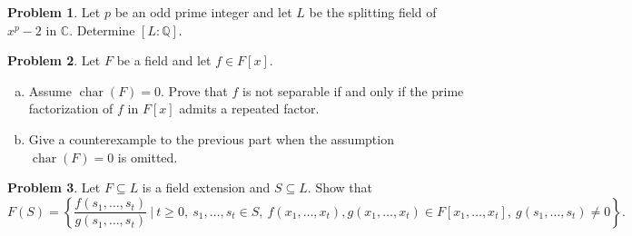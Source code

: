 \documentclass[11pt]{article}
\DeclareMathOperator{\ch}{char}
\newcommand{\C}{\mathbb{C}}
\newcommand{\Q}{\mathbb{Q}}
\theoremstyle{definition}
\newtheorem{problem}{Problem}
\begin{document}
\begin{problem}
Let $p$ be an odd prime integer and let $L$ be the splitting field of $x^p-2$ in $\C$. Determine $[L:\Q]$.
\end{problem}

\begin{problem}
Let $F$ be a field and let $f \in F[x]$.
\begin{enumerate}[(a)]
\item Assume $\ch(F) = 0$. Prove that $f$ is not separable if and only if the prime factorization of $f$ in $F[x]$ admits a repeated factor.

\item Give a counterexample to the previous part when the assumption $\ch(F) = 0$ is omitted.
\end{enumerate}
\end{problem}

\begin{problem} Let $F\subseteq L$ is a field extension and $S\subseteq L$. Show that  
\[ F(S) = \left\{ \frac{f(s_1,\dots,s_t)}{g(s_1,\dots,s_t)} \ \Big| \  t\geq 0, \ s_1,\dots,s_t\in S, \ f(x_1,\dots,x_t), g(x_1,\dots,x_t)\in F[x_1,\dots,x_t], \ g(s_1,\dots,s_t)\neq 0\right\}.\]
\end{problem}
\end{document}

